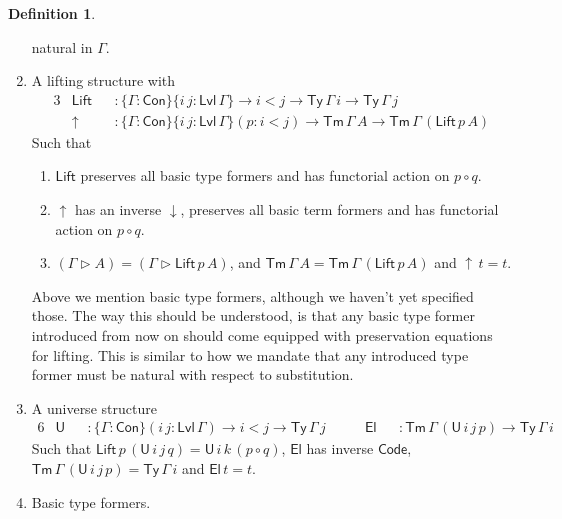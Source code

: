 \documentclass[a4paper,UKenglish,cleveref, autoref, thm-restate]{lipics-v2021}
\theoremstyle{remark}
\theoremstyle{definition}
\newtheorem{mydefinition}{Definition}
\newcommand{\Con}{\mathsf{Con}}
\newcommand{\Ty}{\mathsf{Ty}}
\newcommand{\Tm}{\mathsf{Tm}}
\newcommand{\U}{\mathsf{U}}
\newcommand{\El}{\mathsf{El}}
\newcommand{\ext}{\triangleright}
\newcommand{\up}{\uparrow}
\newcommand{\down}{\downarrow}
\newcommand{\Lift}{\mathsf{Lift}}
\newcommand{\Lvl}{\mathsf{Lvl}}
\renewcommand{\U}{\mathsf{U}}
\newcommand{\Code}{\mathsf{Code}}
\begin{document}
\begin{mydefinition}
\begin{enumerate}
  natural in $\Gamma$.
\item A lifting structure with
  \begin{alignat*}{3}
    &\Lift &&: \{\Gamma : \Con\}\{i\,j : \Lvl\,\Gamma\} \to i < j \to \Ty\,\Gamma\,i \to \Ty\,\Gamma\,j\\
    &\up   &&: \{\Gamma : \Con\}\{i\,j : \Lvl\,\Gamma\}(p : i < j) \to \Tm\,\Gamma\,A \to \Tm\,\Gamma\,(\Lift\,p\,A)
  \end{alignat*}
  Such that
  \begin{enumerate}
    \item $\Lift$ preserves all basic type formers and has functorial action on $p \circ q$.
    \item $\up$ has an inverse $\down$, preserves all basic term formers and has functorial action on $p \circ q$.
    \item $(\Gamma \ext A) = (\Gamma \ext \Lift\,p\,A)$, and $\Tm\,\Gamma\,A = \Tm\,\Gamma\,(\Lift\,p\,A)$ and $\up\,t = t$.
  \end{enumerate}

  Above we mention basic type formers, although we haven't yet specified
  those. The way this should be understood, is that any basic type former introduced
  from now on should come equipped with preservation equations for lifting. This is
  similar to how we mandate that any introduced type former must be natural with respect
  to substitution.
\item A universe structure
  \begin{alignat*}{6}
    &\U  &&: \{\Gamma : \Con\}(i\,j : \Lvl\,\Gamma) \to i < j \to \Ty\,\Gamma\,j\hspace{2em}
    &\El &&: \Tm\,\Gamma\,(\U\,i\,j\,p) \to \Ty\,\Gamma\,i
  \end{alignat*}
  Such that $\Lift\,p\,(\U\,i\,j\,q) = \U\,i\,k\,(p \circ q)$, $\El$ has
  inverse $\Code$, $\Tm\,\Gamma\,(\U\,i\,j\,p) = \Ty\,\Gamma\,i$ and $\El\,t =
  t$.
\item Basic type formers.
\end{enumerate}
\end{mydefinition}
\end{document}
